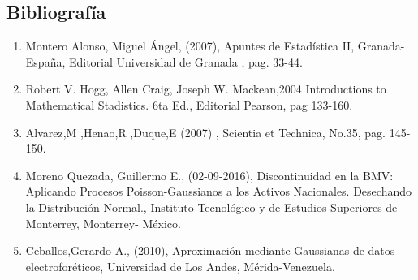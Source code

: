 \documentclass[12pt,a4paper]{article}
\begin{document}
\begin{multicols}{2}
\section{Bibliografía}
\begin{enumerate}
    \item Montero Alonso, Miguel Ángel, (2007), Apuntes de Estadística II, Granada-España, Editorial Universidad de Granada , pag. 33-44.
    \item Robert V. Hogg, Allen Craig, Joseph W. Mackean,2004 Introductions to Mathematical Stadistics. 6ta Ed., Editorial Pearson, pag 133-160. 
    \item Alvarez,M ,Henao,R ,Duque,E (2007) , Scientia et Technica, No.35, pag. 145-150.
    \item Moreno Quezada, Guillermo E., (02-09-2016), Discontinuidad en la BMV: Aplicando Procesos Poisson-Gaussianos a los Activos Nacionales. Desechando la Distribución Normal., Instituto Tecnológico y de Estudios Superiores de Monterrey, Monterrey- México.
    \item Ceballos,Gerardo A., (2010), Aproximación mediante Gaussianas de datos electroforéticos, Universidad de Los Andes, Mérida-Venezuela.
\end{enumerate}
\end{multicols}
\end{document}
